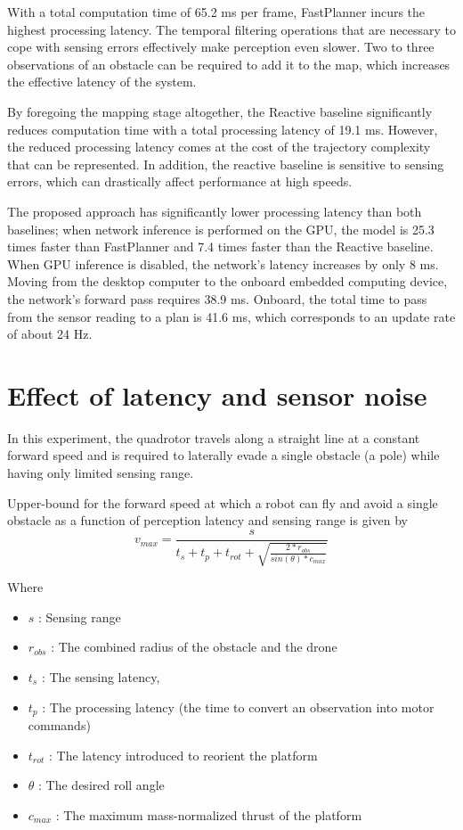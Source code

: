 With a total computation time of 65.2 ms per frame, FastPlanner \cite{fastPlanner} incurs the highest processing latency. The temporal filtering operations that are necessary to cope with sensing errors effectively make perception even slower. Two to three observations of an obstacle can be required to add it to the map, which increases the effective latency of the system. 

By foregoing the mapping stage altogether, the Reactive \cite{reactive_method} baseline significantly reduces computation time with a total processing latency of 19.1 ms. However, the reduced processing latency comes at the cost of the trajectory complexity that can be represented. In addition, the reactive\cite{reactive_method} baseline is sensitive to sensing errors, which can drastically affect performance at high speeds.
 

The proposed approach has significantly lower processing latency than both baselines; when network inference is performed on the GPU, the model is 25.3 times faster than FastPlanner \cite{fastPlanner} and 7.4 times faster than the Reactive baseline. When GPU inference is disabled, the network’s latency increases by only 8 ms. Moving from the desktop computer to the onboard embedded computing device, the network’s forward pass requires 38.9 ms. Onboard, the total time to pass from the sensor
reading to a plan is 41.6 ms, which corresponds to an update rate of about 24 Hz.


\section{Effect of latency and sensor noise}
In this experiment, the quadrotor travels along a straight line at a constant forward speed and is required to laterally evade a single obstacle (a pole) while having only limited sensing range. 

Upper-bound for the forward speed at which a robot can fly and avoid a single obstacle as a function of perception latency and sensing range is given by
\begin{equation}
	v_{max} = \frac{s}{t_s + t_p + t_{rot} + \sqrt{\frac{2*r_{obs}}{sin(\theta)*c_{max}}}}
\end{equation}

Where
\begin{itemize}
	\item $s$ : Sensing range
	\item $r_{obs}$ : The combined radius of the obstacle and the drone
	\item $t_s$ : The sensing latency,
	\item $t_p$ : The processing latency (the time to convert an observation into motor commands)
	\item $t_{rot}$ : The latency introduced to reorient the platform
	\item $\theta$ : The desired roll angle
	\item $c_{max}$ : The maximum mass-normalized thrust of the platform
\end{itemize}

